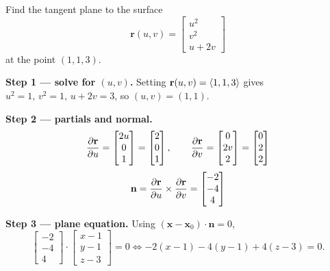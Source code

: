\begin{example}
  Find the tangent plane to the surface
  \[
    \mathbf{r}(u,v) =
    \begin{bmatrix}
      u^2 \\ v^2 \\ u+2v
    \end{bmatrix}
  \]
  at the point $(1,1,3)$.

  \textbf{Step 1 — solve for $(u,v)$.} Setting $\mathbf{r}(u,v) = \langle 1,1,3 \rangle$ gives
  $u^2=1,\,v^2=1,\,u+2v=3$, so $(u,v) = (1,1)$.

  \textbf{Step 2 — partials and normal.}
  \[
    \frac{\partial \mathbf{r}}{\partial u} =
    \begin{bmatrix}
      2u \\ 0 \\ 1
    \end{bmatrix}
    =
    \begin{bmatrix}
      2 \\ 0 \\ 1
    \end{bmatrix}
    ,\qquad
    \frac{\partial \mathbf{r}}{\partial v} =
    \begin{bmatrix}
      0 \\ 2v \\ 2
    \end{bmatrix}
    =
    \begin{bmatrix}
      0 \\ 2 \\ 2
    \end{bmatrix}
  \]
  \[
    \mathbf{n} = \frac{\partial \mathbf{r}}{\partial u}\times\frac{\partial \mathbf{r}}{\partial v}
    =
    \begin{bmatrix}
      -2 \\ -4 \\ 4
    \end{bmatrix}
  \]

  \textbf{Step 3 — plane equation.} Using $(\mathbf{x}-\mathbf{x}_0)\cdot\mathbf{n}=0$,
  \[
    \begin{bmatrix}
      -2 \\ -4 \\ 4
    \end{bmatrix}
    \cdot
    \begin{bmatrix}
      x-1 \\ y-1 \\ z-3
    \end{bmatrix}
    = 0
    \iff
    -2(x-1) - 4(y-1) + 4(z-3) = 0.
  \]
\end{example}

